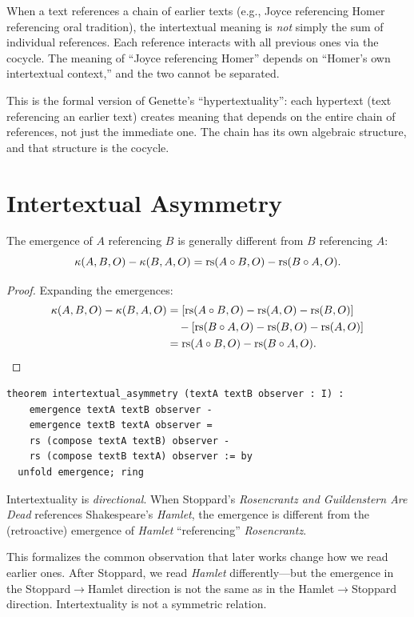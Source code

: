 \begin{interpretation}
When a text references a chain of earlier texts (e.g., Joyce referencing
Homer referencing oral tradition), the intertextual meaning is \emph{not}
simply the sum of individual references.  Each reference interacts with
all previous ones via the cocycle.  The meaning of ``Joyce referencing
Homer'' depends on ``Homer's own intertextual context,'' and the two
cannot be separated.

This is the formal version of Genette's ``hypertextuality'': each
hypertext (text referencing an earlier text) creates meaning that
depends on the entire chain of references, not just the immediate one.
The chain has its own algebraic structure, and that structure is the
cocycle.
\end{interpretation}

\section{Intertextual Asymmetry}

\begin{theorem}
\label{thm:inter-asymmetry}
The emergence of $A$ referencing $B$ is generally different from
$B$ referencing $A$:
\[
  \kappa(A, B, O) - \kappa(B, A, O) =
  \mathrm{rs}(A \circ B, O) - \mathrm{rs}(B \circ A, O).
\]
\end{theorem}

\begin{proof}
Expanding the emergences:
\begin{align*}
  \kappa(A, B, O) - \kappa(B, A, O)
  &= [\mathrm{rs}(A \circ B, O) - \mathrm{rs}(A, O) - \mathrm{rs}(B, O)] \\
  &\quad - [\mathrm{rs}(B \circ A, O) - \mathrm{rs}(B, O) - \mathrm{rs}(A, O)] \\
  &= \mathrm{rs}(A \circ B, O) - \mathrm{rs}(B \circ A, O).
\end{align*}
\end{proof}

\begin{lstlisting}
theorem intertextual_asymmetry (textA textB observer : I) :
    emergence textA textB observer -
    emergence textB textA observer =
    rs (compose textA textB) observer -
    rs (compose textB textA) observer := by
  unfold emergence; ring
\end{lstlisting}

\begin{remark}
Intertextuality is \emph{directional}.  When Stoppard's
\textit{Rosencrantz and Guildenstern Are Dead} references Shakespeare's
\textit{Hamlet}, the emergence is different from the (retroactive)
emergence of \textit{Hamlet} ``referencing'' \textit{Rosencrantz}.

This formalizes the common observation that later works change how we
read earlier ones.  After Stoppard, we read \textit{Hamlet} differently---but
the emergence in the Stoppard$\to$Hamlet direction is not the same as
in the Hamlet$\to$Stoppard direction.  Intertextuality is not a
symmetric relation.
\end{remark}

